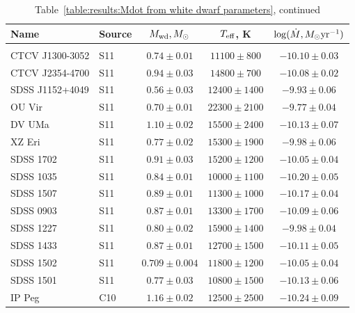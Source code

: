 \begin{table}
    \centering
    \caption{Table~\ref{table:results:Mdot from white dwarf parameters}, continued}
    \label{table:results:Mdot from white dwarf parameters cont}
    \begin{tabular}{llccc}
        \hline
        \textbf{Name} & \textbf{Source} & \textbf{$M_{\rm wd}, M_\odot$} & \textbf{$T_{\rm eff}$, K} & \textbf{$\log (\dot M, M_\odot {\rm yr}^{-1})$} \\
        \hline \hline \\
        CTCV J1300-3052  &  S11  & $0.74 \pm 0.01$ & $11100\pm   800$ & $-10.10 \pm 0.03$ \\
        CTCV J2354-4700  &  S11  & $0.94 \pm 0.03$ & $14800\pm   700$ & $-10.08 \pm 0.02$ \\
        SDSS J1152+4049  &  S11  & $0.56 \pm 0.03$ & $12400\pm  1400$ & $ -9.93 \pm 0.06$ \\
        OU Vir           &  S11  & $0.70 \pm 0.01$ & $22300\pm  2100$ & $ -9.77 \pm 0.04$ \\
        DV UMa           &  S11  & $1.10 \pm 0.02$ & $15500\pm  2400$ & $-10.13 \pm 0.07$ \\
        XZ Eri           &  S11  & $0.77 \pm 0.02$ & $15300\pm  1900$ & $ -9.98 \pm 0.06$ \\
        SDSS 1702        &  S11  & $0.91 \pm 0.03$ & $15200\pm  1200$ & $-10.05 \pm 0.04$ \\
        SDSS 1035        &  S11  & $0.84 \pm 0.01$ & $10000\pm  1100$ & $-10.20 \pm 0.05$ \\
        SDSS 1507        &  S11  & $0.89 \pm 0.01$ & $11300\pm  1000$ & $-10.17 \pm 0.04$ \\
        SDSS 0903        &  S11  & $0.87 \pm 0.01$ & $13300\pm  1700$ & $-10.09 \pm 0.06$ \\
        SDSS 1227        &  S11  & $0.80 \pm 0.02$ & $15900\pm  1400$ & $ -9.98 \pm 0.04$ \\
        SDSS 1433        &  S11  & $0.87 \pm 0.01$ & $12700\pm  1500$ & $-10.11 \pm 0.05$ \\
        SDSS 1502        &  S11  & $0.709\pm0.004$ & $11800\pm  1200$ & $-10.05 \pm 0.04$ \\
        SDSS 1501        &  S11  & $0.77 \pm 0.03$ & $10800\pm  1500$ & $-10.13 \pm 0.06$ \\
        IP Peg           &  C10  & $1.16 \pm 0.02$ & $12500\pm  2500$ & $-10.24 \pm 0.09$ \\

        \hline
    \end{tabular}
\end{table}